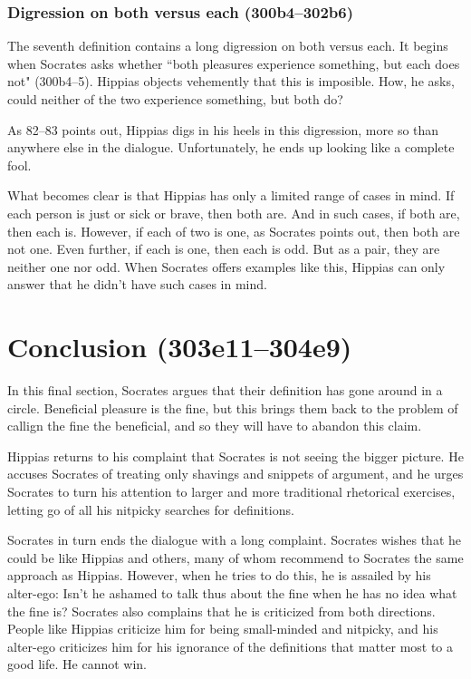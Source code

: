 \documentclass[11pt]{article}
\begin{document}

\subsubsection{Digression on both versus each (300b4--302b6)}

The seventh definition contains a long digression on both versus each.  It
begins when Socrates asks whether ``both pleasures experience something,
but each does not" (300b4--5).  Hippias objects vehemently that this is
imposible.  How, he asks, could neither of the two experience something,
but both do?

As \citet{woodruff1982} 82--83 points out, Hippias digs in his heels in
this digression, more so than anywhere else in the dialogue.
Unfortunately, he ends up looking like a complete fool.

What becomes clear is that Hippias has only a limited range of cases in
mind.  If each person is just or sick or brave, then both are.  And in such
cases, if both are, then each is.  However, if each of two is one, as
Socrates points out, then both are not one.  Even further, if each is one,
then each is odd.  But as a pair, they are neither one nor odd.  When
Socrates offers examples like this, Hippias can only answer that he didn't
have such cases in mind.



\section{Conclusion (303e11--304e9)}

In this final section, Socrates argues that their definition has gone
around in a circle.  Beneficial pleasure is the fine, but this brings them
back to the problem of callign the fine the beneficial, and so they will
have to abandon this claim.

Hippias returns to his complaint that Socrates is not seeing the bigger
picture.  He accuses Socrates of treating only shavings and snippets of
argument, and he urges Socrates to turn his attention to larger and more
traditional rhetorical exercises, letting go of all his nitpicky searches
for definitions.

Socrates in turn ends the dialogue with a long complaint.  Socrates wishes
that he could be like Hippias and others, many of whom recommend to
Socrates the same approach as Hippias.  However, when he tries to do this,
he is assailed by his alter-ego: Isn't he ashamed to talk thus about the
fine when he has no idea what the fine is?  Socrates also complains that he
is criticized from both directions.  People like Hippias criticize him for
being small-minded and nitpicky, and his alter-ego criticizes him for his
ignorance of the definitions that matter most to a good life.  He cannot
win.
\end{document}
